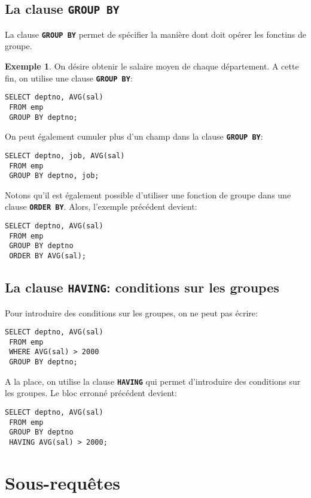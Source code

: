 \documentclass[a4paper, 12pt]{report}
\newcommand{\textSQL}[1]{\texttt{\textbf{#1}}}
\theoremstyle{definition} \newtheorem{ex}{Exemple}
\begin{document}
\section{La clause \textSQL{GROUP BY}}

La clause \textSQL{GROUP BY} permet de spécifier la manière dont doit opérer les fonctins de groupe.
\begin{ex}
On désire obtenir le salaire moyen de chaque département. A cette fin, on utilise une clause \textSQL{GROUP BY}:
\begin{lstlisting}[frame=single]
SELECT deptno, AVG(sal)
 FROM emp
 GROUP BY deptno;
\end{lstlisting}

On peut également cumuler plus d'un champ dans la clause \textSQL{GROUP BY}:
\begin{lstlisting}[frame=single]
SELECT deptno, job, AVG(sal)
 FROM emp
 GROUP BY deptno, job;
\end{lstlisting}

Notons qu'il est également possible d'utiliser une fonction de groupe dans une clause \textSQL{ORDER BY}. Alors, l'exemple précédent devient:
\begin{lstlisting}[frame=single]
SELECT deptno, AVG(sal)
 FROM emp
 GROUP BY deptno
 ORDER BY AVG(sal);
\end{lstlisting}
\end{ex} 

\section[La clause \textSQL{HAVING}]{La clause \textSQL{HAVING}: conditions sur les groupes}
Pour introduire des conditions sur les groupes, on ne peut pas écrire:
\begin{lstlisting}[frame=single]
SELECT deptno, AVG(sal)
 FROM emp
 WHERE AVG(sal) > 2000
 GROUP BY deptno;
\end{lstlisting}

A la place, on utilise la clause \textSQL{HAVING} qui permet d'introduire des conditions sur les groupes. Le bloc erronné précédent devient:
\begin{lstlisting}[frame=single]
SELECT deptno, AVG(sal)
 FROM emp
 GROUP BY deptno
 HAVING AVG(sal) > 2000;
\end{lstlisting}

\chapter{Sous-requêtes}
\end{document}
